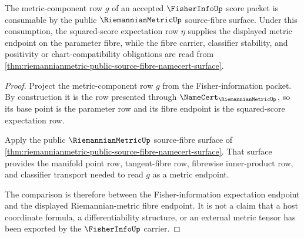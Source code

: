 \begin{theorem}
\label{thm:fisherinfo-riemannianmetric-comparison-obligation}
The metric-component row $g$ of an accepted $\FisherInfoUp$ score packet is
consumable by the public $\RiemannianMetricUp$ source-fibre surface. Under this
consumption, the squared-score expectation row $\eta$ supplies the displayed
metric endpoint on the parameter fibre, while the fibre carrier, classifier
stability, and positivity or chart-compatibility obligations are read from
\autoref{thm:riemannianmetric-public-source-fibre-namecert-surface}.
\end{theorem}
\begin{proof}
Project the metric-component row $g$ from the Fisher-information packet. By
construction it is the row presented through
$\NameCert_{\RiemannianMetricUp}$, so its base point is the parameter row and
its fibre endpoint is the squared-score expectation row.

Apply the public $\RiemannianMetricUp$ source-fibre surface of
\autoref{thm:riemannianmetric-public-source-fibre-namecert-surface}. That
surface provides the manifold point row, tangent-fibre row, fibrewise
inner-product row, and classifier transport needed to read $g$ as a metric
endpoint.

The comparison is therefore between the Fisher-information expectation
endpoint and the displayed Riemannian-metric fibre endpoint. It is not a claim
that a host coordinate formula, a differentiability structure, or an external
metric tensor has been exported by the $\FisherInfoUp$ carrier.
\end{proof}

